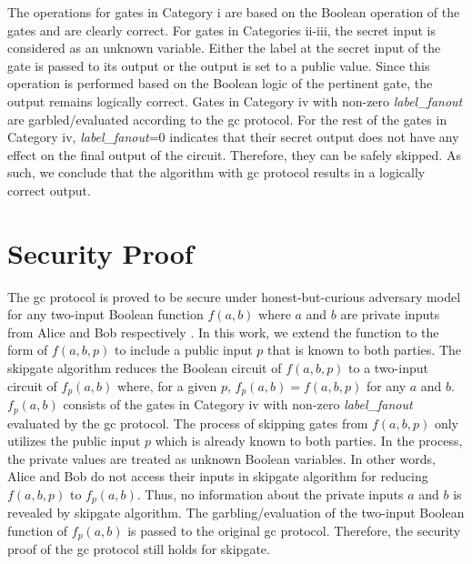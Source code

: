 The operations for gates in Category i are based on the Boolean operation of the gates and are clearly correct.
For gates in Categories ii-iii, the secret input is considered as an unknown variable.
Either the label at the secret input of the gate is passed to its output or the output is set to a public value.
Since this operation is performed based on the Boolean logic of the pertinent gate, the output remains logically correct.
Gates in Category iv with non-zero \textit{label\_fanout} are garbled/evaluated according to the \acrshort{gc} protocol.
For the rest of the gates in Category iv, \textit{label\_fanout}=0 indicates that their secret output does not have any effect on the final output of the circuit.
Therefore, they can be safely skipped.
As such, we conclude that the algorithm with \acrshort{gc} protocol results in a logically correct output.

\section{Security Proof}\label{sec:skipgate-security}
The \acrshort{gc} protocol is proved to be secure under honest-but-curious adversary model for any two-input Boolean function $f(a, b)$ where $a$ and $b$ are private inputs from Alice and Bob respectively \cite{lindell2009proof, bellare2013efficient}.
In this work, we extend the function to the form of $f(a, b, p)$ to include a public input $p$ that is known to both parties.
The \gls{skipgate} algorithm reduces the Boolean circuit of $f(a, b, p)$ to a two-input circuit of $f_p(a, b)$ where, for a given $p$, $f_p(a, b) = f(a, b, p)$ for any $a$ and $b$.
$f_p(a, b)$ consists of the gates in Category iv with non-zero \textit{label\_fanout} evaluated by the \acrshort{gc} protocol.
The process of skipping gates from $f(a, b, p)$ only utilizes the public input $p$ which is already known to both parties.
In the process, the private values are treated as unknown Boolean variables.
In other words, Alice and Bob do not access their inputs in \gls{skipgate} algorithm for reducing $f(a,b,p)$ to $f_p(a, b)$.
Thus, no information about the private inputs $a$ and $b$ is revealed by \gls{skipgate} algorithm.
The garbling/evaluation of the two-input Boolean function of $f_p(a,b)$ is passed to the original \acrshort{gc} protocol.
Therefore, the security proof of the \acrshort{gc} protocol still holds for \gls{skipgate}.
